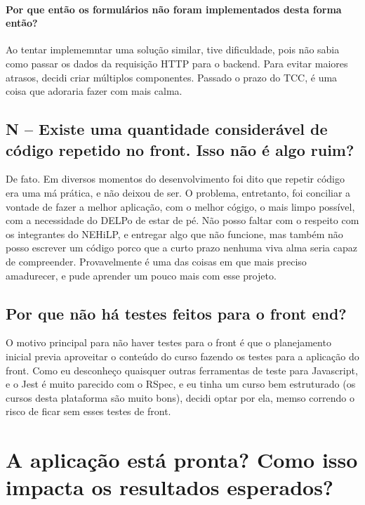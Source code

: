 \paragraph{Por que então os formulários não foram implementados desta forma então?} Ao tentar implememntar uma solução
similar, tive dificuldade, pois não sabia como passar os dados da requisição HTTP para o backend. Para evitar maiores
atrasos, decidi criar múltiplos componentes. Passado o prazo do TCC, é uma coisa que adoraria fazer com mais calma.

\subsection{N -- Existe uma quantidade considerável de código repetido no front. Isso não é algo ruim?}
\label{subsec:no-dry}

De fato. Em diversos momentos do desenvolvimento foi dito que repetir código era uma má prática, e não deixou de ser. O
problema, entretanto, foi conciliar a vontade de fazer a melhor aplicação, com o melhor cógigo, o mais limpo possível,
com a necessidade do DELPo de estar de pé. Não posso faltar com o respeito com os integrantes do NEHiLP, e entregar algo
que não funcione, mas também não posso escrever um código porco que a curto prazo nenhuma viva alma seria capaz de
compreender. Provavelmente é uma das coisas em que mais preciso amadurecer, e pude aprender um pouco mais com esse projeto.

\subsection{Por que não há testes feitos para o front end?}\label{subsec:no-tests-for-nuxt}

O motivo principal para não haver testes para o front é que o planejamento inicial previa aproveitar o conteúdo do curso
\href{https://vueschool.io/courses/learn-how-to-test-vuejs-components}{} fazendo os testes
para a aplicação do front. Como eu desconheço quaisquer outras ferramentas de teste para Javascript, e o Jest é muito
parecido com o RSpec, e eu tinha um curso bem estruturado (os cursos desta plataforma são muito bons), decidi optar por
ela, memso correndo o risco de ficar sem esses testes de front.

\section{A aplicação está pronta? Como isso impacta os resultados esperados?}
\label{sec:is-it-ready}

